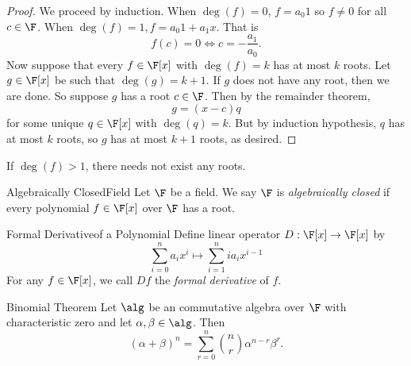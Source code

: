 \documentclass[linearalgebraII]{subfiles}
\begin{document}
    \begin{proof}
        We proceed by induction. When $\deg(f) = 0$, $f = a_0 1$ so $f\neq 0$ for all $c\in \F$. When $\deg(f) = 1, f = a_0 1+a_1x$. That is
        \begin{equation*}
            f(c) = 0 \iff c = -\frac{a_1}{a_0}.
        \end{equation*}
        Now suppose that every $f\in \F[x]$ with $\deg(f) = k$ has at most $k$ roots. Let $g\in \F[x]$ be such that $\deg(g) = k+1$. If $g$ does not have any root, then we are done. So suppose $g$ has a root $c\in \F$. Then by the remainder theorem,
        \begin{equation*}
            g = (x-c)q
        \end{equation*}
        for some unique $q\in \F[x]$ with $\deg(q) = k$. But by induction hypothesis, $q$ has at most $k$ roots, so $g$ has at most $k+1$ roots, as desired.
    \end{proof}

    \begin{remark}
        If $\deg(f)>1$, there needs not exist any roots.
    \end{remark}

    \begin{definition}{Algebraically Closed}{Field}
        Let $\F$ be a field. We say $\F$ is \emph{algebraically closed} if every polynomial $f\in\F[x]$ over $\F$ has a root.
    \end{definition}

    \begin{definition}{Formal Derivative}{of a Polynomial}
        Define linear operator $D: \F[x]\to \F[x]$ by
        \begin{equation*}
            \sum^n_{i=0} a_ix^i\mapsto \sum^n_{i=1} ia_ix^{i-1} 
        \end{equation*}
        For any $f\in\F[x]$, we call $Df$ the \emph{formal derivative} of $f$.
    \end{definition}

    \begin{theorem}{Binomial Theorem}
        Let $\alg$ be an commutative algebra over $\F$ with characteristic zero and let $\alpha, \beta \in \alg$. Then
        \begin{equation*}
            (\alpha + \beta)^n = \sum^n_{r=0} \binom{n}{r} \alpha^{n-r}\beta^r.
        \end{equation*}
    \end{theorem}
\end{document}
